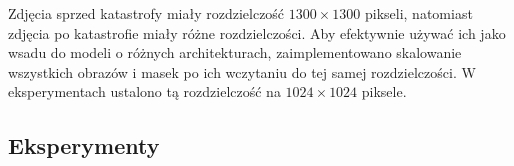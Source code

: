 Zdjęcia sprzed katastrofy miały rozdzielczość $1300\times 1300$ pikseli, natomiast zdjęcia po katastrofie miały różne rozdzielczości. Aby efektywnie używać ich jako wsadu do modeli o różnych architekturach, zaimplementowano skalowanie wszystkich obrazów i masek po ich wczytaniu do tej samej rozdzielczości. W eksperymentach ustalono tą rozdzielczość na $1024\times 1024$ piksele.
\subsection{Eksperymenty}

